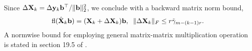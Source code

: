 Since $\Delta \mathbf{X}_k = \Delta\mathbf{y}_k\mathbf{b}^{\top}/\|\mathbf{b}\|_2^2$, we conclude with a backward matrix norm bound, 
\begin{equation}
\fl(\hat{\bb{X}}_{k}\bb{b}) = (\bb{X}_{k} + \Delta \bb{X}_{k})\bb{b}, \;\; \|\Delta \bb{X}_{k}\|_F \leq r\tilde{\gamma}_{m-(k-1)r}.\label{eqn:Xkbound}
\end{equation}
A normwise bound for employing general matrix-matrix multiplication operation is stated in section 19.5 of \cite{Higham2002}.
